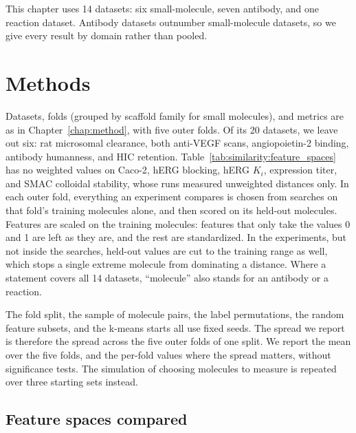 This chapter uses 14 datasets: six small-molecule, seven antibody, and one reaction dataset. Antibody datasets outnumber small-molecule datasets, so we give every result by domain rather than pooled.

\section{Methods}\label{sec:similarity:methods}

Datasets, folds (grouped by scaffold family for small molecules), and metrics are as in Chapter~\ref{chap:method}, with five outer folds. Of its 20 datasets, we leave out six: rat microsomal clearance, both anti-VEGF scans, angiopoietin-2 binding, antibody humanness, and HIC retention. Table~\ref{tab:similarity:feature_spaces} has no weighted values on Caco-2, hERG blocking, hERG $K_i$, expression titer, and SMAC colloidal stability, whose runs measured unweighted distances only. In each outer fold, everything an experiment compares is chosen from searches on that fold's training molecules alone, and then scored on its held-out molecules. Features are scaled on the training molecules: features that only take the values 0 and 1 are left as they are, and the rest are standardized. In the experiments, but not inside the searches, held-out values are cut to the training range as well, which stops a single extreme molecule from dominating a distance. Where a statement covers all 14 datasets, ``molecule'' also stands for an antibody or a reaction.

The fold split, the sample of molecule pairs, the label permutations, the random feature subsets, and the k-means starts all use fixed seeds. The spread we report is therefore the spread across the five outer folds of one split. We report the mean over the five folds, and the per-fold values where the spread matters, without significance tests. The simulation of choosing molecules to measure is repeated over three starting sets instead.

\subsection{Feature spaces compared}\label{sec:similarity:spaces}


